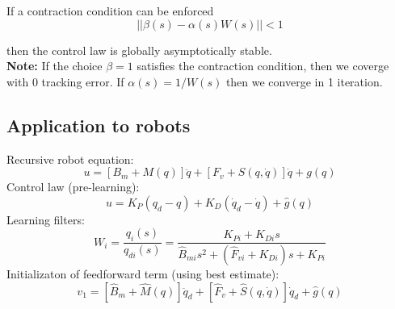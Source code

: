 \documentclass[a4paper,12pt]{article}
\begin{document}
If a contraction condition can be enforced 
\begin{equation}
    ||\beta(s)-\alpha(s)W(s)|| < 1
\end{equation}

then the control law is globally asymptotically stable.\\
\textbf{Note:} If the choice $\beta = 1$ satisfies the contraction
condition, then we coverge with 0 tracking error. If $\alpha(s)=1/W(s)$
then we converge in 1 iteration.
\subsection{Application to robots}
Recursive robot equation:
\begin{equation}
    u = [B_m+M(q)]\ddot{q} + [F_v+S(q,\dot{q})]\dot{q} + g(q)
\end{equation}
Control law (pre-learning):
\begin{equation}
    u = K_P(q_d-q) + K_D(\dot{q}_d-\dot{q}) + \hat{g}(q)
\end{equation}
Learning filters:
\begin{equation}
    W_i=\frac{q_i(s)}{q_{di}(s)}=\frac{K_{Pi}+K_{Di}s}{\hat{B}_{mi}s^2+(\hat{F}_{vi}+K_{Di})s+K_{Pi}}
\end{equation}
Initializaton of feedforward term (using best estimate):
\begin{equation}
    v_1=[\hat{B}_m+\hat{M}(q)]\ddot{q}_d + [\hat{F}_v+\hat{S}(q,\dot{q})]\dot{q}_d + \hat{g}(q)
\end{equation}
\end{document}
